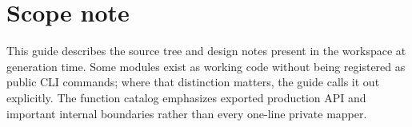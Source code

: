\documentclass[12pt,oneside]{book}
\begin{document}
\backmatter
\chapter*{Scope note}
This guide describes the source tree and design notes present in the workspace at generation time. Some modules exist as working code without being registered as public CLI commands; where that distinction matters, the guide calls it out explicitly. The function catalog emphasizes exported production API and important internal boundaries rather than every one-line private mapper.
\end{document}
